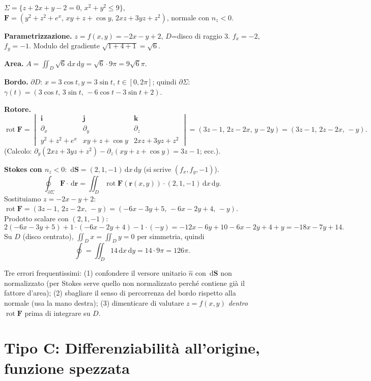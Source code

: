\documentclass[11pt,a4paper,openany]{book}
\theoremstyle{plain}
\theoremstyle{definition}
\theoremstyle{remark}
\newcommand{\dd}{\,\mathrm{d}}
\newcommand{\Rot}{\operatorname{rot}}
\renewcommand{\vec}[1]{\mathbf{#1}}
\newcommand{\F}{\mathbf{F}}
\newcommand{\rr}{\mathbf{r}}
\begin{document}
\begin{esempio}[title={27/1/2025 --- Esercizio 1}]
$\Sigma=\{z+2x+y-2=0,\,x^2+y^2\le 9\}$,
$\F=(y^2+z^2+e^x,\,xy+z+\cos y,\,2xz+3yz+z^2)$,
normale con $n_z<0$.

\textbf{Parametrizzazione.} $z=f(x,y)=-2x-y+2$, $D$=disco di raggio 3.
$f_x=-2$, $f_y=-1$. Modulo del gradiente $\sqrt{1+4+1}=\sqrt{6}$.

\textbf{Area.} $A=\iint_D\sqrt{6}\dd x\dd y=\sqrt{6}\cdot 9\pi=9\sqrt{6}\pi$.

\textbf{Bordo.} $\partial D$: $x=3\cos t,y=3\sin t$, $t\in[0,2\pi]$;
quindi $\partial\Sigma$:
$\gamma(t)=(3\cos t,\,3\sin t,\,-6\cos t-3\sin t+2)$.

\textbf{Rotore.}
\[
\Rot\F=\begin{vmatrix}
\vec i & \vec j & \vec k\\
\partial_x & \partial_y & \partial_z\\
y^2+z^2+e^x & xy+z+\cos y & 2xz+3yz+z^2
\end{vmatrix}
=(3z-1,\,2z-2x,\,y-2y)=(3z-1,\,2z-2x,\,-y).
\]
(Calcolo: $\partial_y(2xz+3yz+z^2)-\partial_z(xy+z+\cos y)=3z-1$; ecc.).

\textbf{Stokes con $n_z<0$}: $\dd\vec S=(2,1,-1)\dd x\dd y$
(si scrive $(f_x,f_y,-1)$). 
\[
\oint_{\partial\Sigma}\F\cdot\dd\rr=\iint_D\Rot\F(\rr(x,y))\cdot(2,1,-1)\dd x\dd y.
\]
Sostituiamo $z=-2x-y+2$:
$\Rot\F=(3z-1,\,2z-2x,\,-y)
=(-6x-3y+5,\,-6x-2y+4,\,-y)$.
Prodotto scalare con $(2,1,-1)$:
\[
2(-6x-3y+5)+1\cdot(-6x-2y+4)-1\cdot(-y)
=-12x-6y+10-6x-2y+4+y=-18x-7y+14.
\]
Su $D$ (disco centrato), $\iint_D x=\iint_D y=0$ per simmetria, quindi
\[
\oint=\iint_D 14\dd x\dd y=14\cdot 9\pi=126\pi.
\]
\end{esempio}

\begin{trappola}
Tre errori frequentissimi:
(1) confondere il versore unitario $\hat n$ con $\dd\vec S$ non
normalizzato (per Stokes serve quello non normalizzato perch\'e
contiene gi\`a il fattore d'area);
(2) sbagliare il senso di percorrenza del bordo rispetto alla normale
(usa la mano destra\!);
(3) dimenticare di valutare $z=f(x,y)$ \emph{dentro} $\Rot\F$ prima
di integrare su $D$.
\end{trappola}

\section{Tipo C: Differenziabilit\`a all'origine, funzione spezzata}
\end{document}
